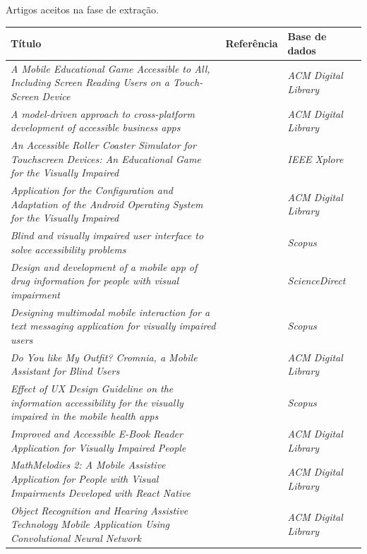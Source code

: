 \begin{quadro}[htb!]
\caption{\label{qua-art-ext}Artigos aceitos na fase de extração.}
\begin{tabular}{|m{9.5cm} | m{2.7cm} | m{2.5cm}|}
    \hline
   \textbf{Título} & \textbf{Referência} & \textbf{Base de dados} \\ \hline
    \emph{A Mobile Educational Game Accessible to All, Including Screen Reading Users on a Touch-Screen Device} & \cite{Leporini2017} & \emph{ACM Digital Library} \\ \hline
    \emph{A model-driven approach to cross-platform development of accessible business apps} & \cite{Christoph2020} & \emph{ACM Digital Library} \\ \hline
    \emph{An Accessible Roller Coaster Simulator for Touchscreen Devices: An Educational Game for the Visually Impaired} & \cite{Biase2018} & \emph{IEEE Xplore} \\ \hline
    \emph{Application for the Configuration and Adaptation of the Android Operating System for the Visually Impaired} & \cite{Oliveira2018} & \emph{ACM Digital Library} \\ \hline
    \emph{Blind and visually impaired user interface to solve accessibility problems} & \cite{Shera2021285} & \emph{Scopus} \\ \hline
    \emph{Design and development of a mobile app of drug information for people with visual impairment} & \cite{Amariles2020} & \emph{ScienceDirect} \\ \hline
    \emph{Designing multimodal mobile interaction for a text messaging application for visually impaired users} & \cite{Duarte2017} & \emph{Scopus} \\ \hline
    \emph{Do You like My Outfit? Cromnia, a Mobile Assistant for Blind Users} & \cite{Giuliana2018} & \emph{ACM Digital Library} \\ \hline
    \emph{Effect of UX Design Guideline on the information accessibility for the visually impaired in the mobile health apps} & \cite{Kim20191103} & \emph{Scopus} \\ \hline
    \emph{Improved and Accessible E-Book Reader Application for Visually Impaired People} & \cite{Heesook2017} & \emph{ACM Digital Library} \\ \hline
    \emph{MathMelodies 2: A Mobile Assistive Application for People with Visual Impairments Developed with React Native} & \cite{Ducci2018} & \emph{ACM Digital Library} \\ \hline
    \emph{Object Recognition and Hearing Assistive Technology Mobile Application Using Convolutional Neural Network} & \cite{Caballero2020} & \emph{ACM Digital Library} \\ \hline

\end{tabular}
\end{quadro}
